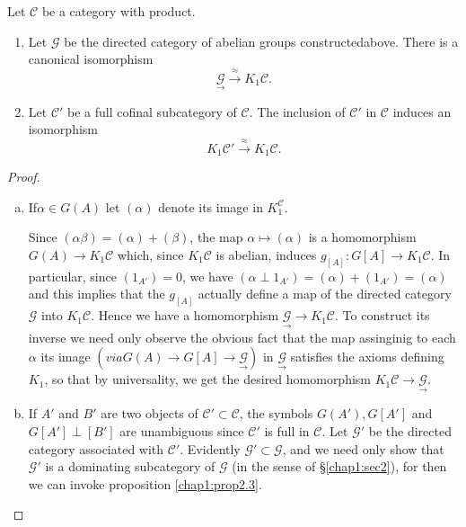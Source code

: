 \begin{theorem}\label{chap1:thm3.1}%
Let $\mathscr{C}$ be a category with product. 
\begin{enumerate}
\renewcommand{\labelenumi}{(\theenumi)}
\item Let $\mathscr{G}$ be the directed category of abelian groups
  constructed\break above. There is a canonical isomorphism 
$$
\underset{\to}{\mathscr{G}} \xrightarrow{\approx} K_1 \mathscr{C}.  
$$

\item Let $\mathscr{C}'$ be a full cofinal subcategory of
  $\mathscr{C}$. The inclusion of $\mathscr{C}'$ in $\mathscr{C}$
  induces an isomorphism  
$$
K_1 \mathscr{C}' \xrightarrow{\approx} K_1 \mathscr{C}.
$$
\end{enumerate}
\end{theorem}

\begin{proof}
\begin{enumerate}[(a)]
\item If\pageoriginale $\alpha \in G (A)$ let $(\alpha)$ denote its
  image in $K^{\mathscr{C}}_1$.  

Since $(\alpha \beta) = (\alpha) + (\beta)$, the map $\alpha \mapsto
(\alpha)$ is a homomorphism $G(A) \to K_1 \mathscr{C}$ which, since
$K_1 \mathscr{C}$ is abelian, induces $g_{[A]} : G [A] \to K_1
\mathscr{C}$. In particular, since $(1_{A'}) = 0$, we have $(\alpha \perp
1_{A'}) = (\alpha) + (1_{A'}) = (\alpha)$ and this implies that the
$g_{[A]}$ actually define a map of the directed category $\mathscr{G}$
into $K_1 \mathscr{C}$. Hence we have a homomorphism
$\underset{\to}{\mathscr{G}} \to K_1 \mathscr{C}$. To construct its
inverse we need only observe the obvious fact that the map assinginig
to each $\alpha$ its image $(via G(A) \to G[A] \to
\underset{\to}{\mathscr{G}})$ in $\underset{\to}{\mathscr{G}}$ satisfies
the axioms defining $K_1$, so that by universality, we get the desired
homomorphism $K_1 \mathscr{C} \to \underset{\to}{\mathscr{G}}$. 

\item If $A'$ and $B'$ are two objects of $\mathscr{C}' \subset
  \mathscr{C}$, the symbols $G(A'), G[A']$ and $G[A'] \perp [B']$ are
  unambiguous since $\mathscr{C}'$ is full in $\mathscr{C}$. Let
  $\mathscr{G}'$ be the directed category associated with
  $\mathscr{C}'$. Evidently $\mathscr{G}' \subset \mathscr{G}$, and we
  need only show  that $\mathscr{G}'$ is a dominating subcategory of
  $\mathscr{G}$ (in the sense of \S \ref{chap1:sec2}), for then we can invoke
  proposition \ref{chap1:prop2.3}. 
\end{enumerate}
\end{proof}


